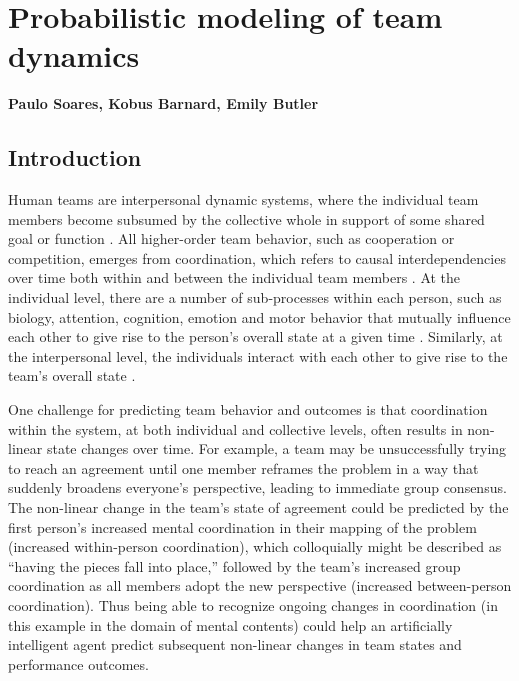 \chapter{Probabilistic modeling of team dynamics}
\label{ch:pgm}
\textbf{Paulo Soares, Kobus Barnard, Emily Butler}

\section{Introduction}
Human teams are interpersonal dynamic systems, where the individual team members
become subsumed by the collective whole in support of some shared goal or
function \citep{nowak2020insync, cooke2013Ainteractive, eiler2017interaction, fusaroli2014dialog, gorman2010team, wiltshire2017problem, wiltshire2019multiscale}.
All higher-order team behavior, such as cooperation or competition, emerges from
coordination, which refers to causal interdependencies over time both within and
between the individual team members \citep{butner2014modeling}. At the individual
level, there are a number of sub-processes within each person, such as biology,
attention, cognition, emotion and motor behavior that mutually influence each
other to give rise to the person’s overall state at a given time \citep{butler2011temporal,butler2017emotions}. Similarly, at the interpersonal level, the individuals interact with each
other to give rise to the team’s overall state \citep{nowak2020insync, butler2011temporal, butler2017emotions, cooke2013Binteractive, gorman2010team, letsky2008macrocognition}.

One challenge for predicting team behavior and outcomes is that coordination
within the system, at both individual and collective levels, often results in
non-linear state changes over time. For example, a team may be unsuccessfully
trying to reach an agreement until one member reframes the problem in a way that
suddenly broadens everyone’s perspective, leading to immediate group consensus.
The non-linear change in the team’s state of agreement could be predicted by the
first person’s increased mental coordination in their mapping of the problem
(increased within-person coordination), which colloquially might be described as
“having the pieces fall into place,” followed by the team’s increased group
coordination as all members adopt the new perspective (increased between-person
coordination). Thus being able to recognize ongoing changes in coordination (in
this example in the domain of mental contents) could help an artificially
intelligent agent predict subsequent non-linear changes in team states and
performance outcomes. 

